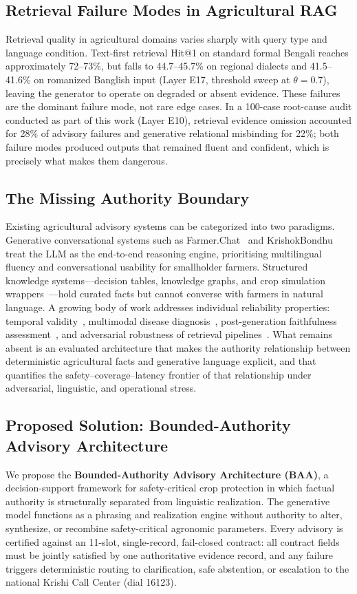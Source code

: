 \subsection{Retrieval Failure Modes in Agricultural RAG}
Retrieval quality in agricultural domains varies sharply with query type and language condition. Text-first retrieval Hit@1 on standard formal Bengali reaches approximately 72--73\%, but falls to 44.7--45.7\% on regional dialects and 41.5--41.6\% on romanized Banglish input (Layer E17, threshold sweep at $\theta{=}0.7$), leaving the generator to operate on degraded or absent evidence. These failures are the dominant failure mode, not rare edge cases. In a 100-case root-cause audit conducted as part of this work (Layer E10), retrieval evidence omission accounted for 28\% of advisory failures and generative relational misbinding for 22\%; both failure modes produced outputs that remained fluent and confident, which is precisely what makes them dangerous.

\subsection{The Missing Authority Boundary}
Existing agricultural advisory systems can be categorized into two paradigms. Generative conversational systems such as Farmer.Chat~\citep{farmerchat2024} and KrishokBondhu~\citep{krishokbondhu2025} treat the LLM as the end-to-end reasoning engine, prioritising multilingual fluency and conversational usability for smallholder farmers. Structured knowledge systems---decision tables, knowledge graphs, and crop simulation wrappers~\citep{goatrag2026,dssatlm2026}---hold curated facts but cannot converse with farmers in natural language. A growing body of work addresses individual reliability properties: temporal validity~\citep{tarag2026}, multimodal disease diagnosis~\citep{smart2026}, post-generation faithfulness assessment~\citep{generateverify2025}, and adversarial robustness of retrieval pipelines~\citep{saferag2025}. What remains absent is an evaluated architecture that makes the authority relationship between deterministic agricultural facts and generative language explicit, and that quantifies the safety--coverage--latency frontier of that relationship under adversarial, linguistic, and operational stress.

\subsection{Proposed Solution: Bounded-Authority Advisory Architecture}
We propose the \textbf{Bounded-Authority Advisory Architecture (BAA)}, a decision-support framework for safety-critical crop protection in which factual authority is structurally separated from linguistic realization. The generative model functions as a phrasing and realization engine without authority to alter, synthesize, or recombine safety-critical agronomic parameters. Every advisory is certified against an 11-slot, single-record, fail-closed contract: all contract fields must be jointly satisfied by one authoritative evidence record, and any failure triggers deterministic routing to clarification, safe abstention, or escalation to the national Krishi Call Center (dial 16123).

